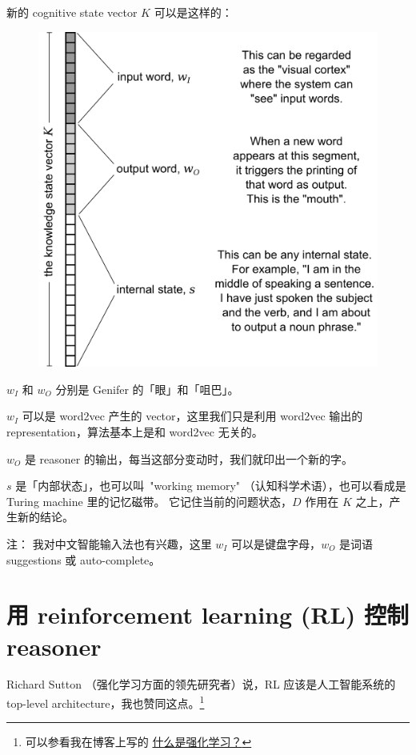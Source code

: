\documentclass[12pt]{article}
\begin{document}
新的 cognitive state vector $K$ 可以是这样的：
\begin{figure}[H]
\centering
\includegraphics[scale=0.75]{internal-state-K.png}
\end{figure}

$w_I$ 和 $w_O$ 分别是 Genifer 的「眼」和「咀巴」。

$w_I$ 可以是 word2vec 产生的 vector，这里我们只是利用 word2vec 输出的 representation，算法基本上是和 word2vec 无关的。

$w_O$ 是 reasoner 的输出，每当这部分变动时，我们就印出一个新的字。 

$s$ 是「内部状态」，也可以叫 \,"working memory" （认知科学术语），也可以看成是 Turing machine 里的记忆磁带。 它记住当前的问题状态，$D$ 作用在 $K$ 之上，产生新的结论。

{\small 注： 我对中文智能输入法也有兴趣，这里 $w_I$ 可以是键盘字母，$w_O$ 是词语 suggestions 或 auto-complete。}

\section{用 reinforcement learning (RL) 控制 reasoner}

Richard Sutton （强化学习方面的领先研究者）说，RL 应该是人工智能系统的 top-level architecture，我也赞同这点。\footnote{可以参看我在博客上写的 \href{http://geniferology.blogspot.hk/2015/04/what-is-reinforcement-learning.html}{什么是强化学习？}}
\end{document}
